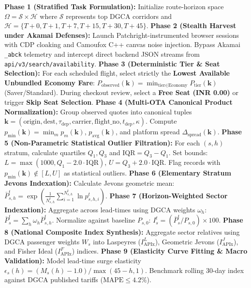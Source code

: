 \documentclass[11pt,a4paper]{article}
\begin{document}
\begin{algorithm}[htbp]
\caption{End-to-End AirGo Yield Aggregation and Price Indexing Methodology}
\label{alg:end_to_end}
\begin{algorithmic}[1]
\State \textbf{Phase 1 (Stratified Task Formulation):} Initialize route-horizon space $\Omega = \mathcal{S} \times \mathcal{H}$ where $\mathcal{S}$ represents top DGCA corridors and $\mathcal{H} = \{T+0, T+1, T+7, T+15, T+30, T+45\}$.
\State \textbf{Phase 2 (Stealth Harvest under Akamai Defenses):} Launch Patchright-instrumented browser sessions with CDP cloaking and Camoufox C++ canvas noise injection. Bypass Akamai \texttt{\_abck} telemetry and intercept direct backend JSON streams from \texttt{api/v3/search/availability}.
\State \textbf{Phase 3 (Deterministic Tier \& Seat Selection):}
    \State \quad For each scheduled flight, select strictly the \textbf{Lowest Available Unbundled Economy Fare}:
    \State \quad $P_{\text{observed}}(\mathbf{k}) = \min_{\text{tier} \in \text{Economy}} P_{\text{tier}}(\mathbf{k})$ (Saver/Standard).
    \State \quad During checkout review, select a \textbf{Free Seat (INR 0.00)} or trigger \textbf{Skip Seat Selection}.
\State \textbf{Phase 4 (Multi-OTA Canonical Product Normalization):}
    \State \quad Group observed quotes into canonical tuples $\mathbf{k} = (\text{origin}, \text{dest}, \tau_{\text{dep}}, \text{carrier}, \text{flight\_no}, t_{\text{dep}}, \kappa)$.
    \State \quad Compute $p_{\min}(\mathbf{k}) = \min_m p_m(\mathbf{k})$, $p_{\text{avg}}(\mathbf{k})$, and platform spread $\Delta_{\text{spread}}(\mathbf{k})$.
\State \textbf{Phase 5 (Non-Parametric Statistical Outlier Filtration):}
    \State \quad For each $(s, h)$ stratum, calculate quartiles $Q_1, Q_3$ and $\text{IQR} = Q_3 - Q_1$.
    \State \quad Set bounds: $L = \max(1000, Q_1 - 2.0 \cdot \text{IQR})$, $U = Q_3 + 2.0 \cdot \text{IQR}$.
    \State \quad Flag records with $p_{\min}(\mathbf{k}) \notin [L, U]$ as statistical outliers.
\State \textbf{Phase 6 (Elementary Stratum Jevons Indexation):}
    \State \quad Calculate Jevons geometric mean: $\bar{P}_{s,h}^t = \exp\left( \frac{1}{N_{s,h}^t} \sum_{i=1}^{N_{s,h}^t} \ln p_{s,h,i}^t \right)$.
\State \textbf{Phase 7 (Horizon-Weighted Sector Indexation):}
    \State \quad Aggregate across lead-times using DGCA weights $\omega_h$: $\bar{P}_s^t = \sum_h \omega_h \bar{P}_{s,h}^t$.
    \State \quad Normalize against baseline $P_{s,0}$: $I_s^t = (\bar{P}_s^t / P_{s,0}) \times 100$.
\State \textbf{Phase 8 (National Composite Index Synthesis):}
    \State \quad Aggregate sector relatives using DGCA passenger weights $W_s$ into Laspeyres ($I_{\text{APIx}}^L$), Geometric Jevons ($I_{\text{APIx}}^J$), and Fisher Ideal ($I_{\text{APIx}}^F$) indices.
\State \textbf{Phase 9 (Elasticity Curve Fitting \& Macro Validation):}
    \State \quad Model lead-time surge elasticity $\epsilon_s(h) = (M_s(h) - 1.0)/\max(45 - h, 1)$.
    \State \quad Benchmark rolling 30-day index against DGCA published tariffs ($\text{MAPE} \le 4.2\%$).
\end{algorithmic}
\end{algorithm}
\end{document}

